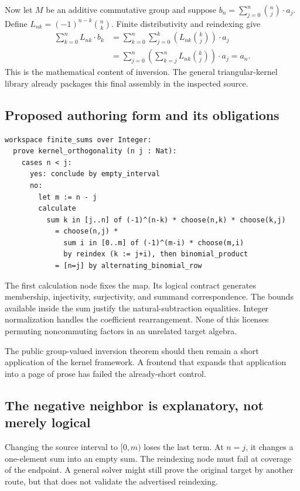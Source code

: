 \documentclass[11pt,letterpaper]{article}
\theoremstyle{definition}
\theoremstyle{remark}
\begin{document}
Now let $M$ be an additive commutative group and suppose
$b_n=\sum_{j=0}^{n}\binom nj\cdot a_j$. Define
$L_{nk}=(-1)^{n-k}\binom nk$. Finite distributivity and reindexing give
\begin{align*}
 \sum_{k=0}^{n}L_{nk}\cdot b_k
 &=\sum_{k=0}^{n}\sum_{j=0}^{k}
          \left(L_{nk}\binom kj\right)\cdot a_j\\
 &=\sum_{j=0}^{n}\left(\sum_{k=j}^{n}L_{nk}\binom kj\right)\cdot a_j
 =a_n.
\end{align*}
This is the mathematical content of inversion. The general triangular-kernel
library already packages this final assembly in the inspected source.

\subsection{Proposed authoring form and its obligations}
\begin{lstlisting}
workspace finite_sums over Integer:
  prove kernel_orthogonality (n j : Nat):
    cases n < j:
      yes: conclude by empty_interval
      no:
        let m := n - j
        calculate
          sum k in [j..n] of (-1)^(n-k) * choose(n,k) * choose(k,j)
            = choose(n,j) *
              sum i in [0..m] of (-1)^(m-i) * choose(m,i)
              by reindex (k := j+i), then binomial_product
            = [n=j] by alternating_binomial_row
\end{lstlisting}
The first calculation node fixes the map. Its logical contract generates
membership, injectivity, surjectivity, and summand correspondence. The bounds
available inside the sum justify the natural-subtraction equalities. Integer
normalization handles the coefficient rearrangement. None of this licenses
permuting noncommuting factors in an unrelated target algebra.

The public group-valued inversion theorem should then remain a short application
of the kernel framework. A frontend that expands that application into a page
of prose has failed the already-short control.

\subsection{The negative neighbor is explanatory, not merely logical}
Changing the source interval to $[0,m)$ loses the last term. At $n=j$, it changes
a one-element sum into an empty sum. The reindexing node must fail at coverage
of the endpoint. A general solver might still prove the original target by
another route, but that does not validate the advertised reindexing.
\end{document}
